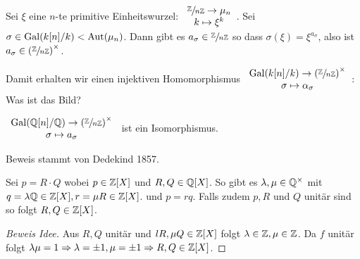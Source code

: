 Sei $\xi$ eine $n $-te primitive Einheitswurzel: $\begin{array}{c} \sfrac{\mathbb{Z}}{n \mathbb{Z}} \to \mu_{n}\\ k \mapsto \xi^{k}\\ \end{array}$.
Sei $\sigma \in \operatorname{Gal}(k[n] / k) < \operatorname{Aut}(\mu_{n})$. Dann gibt es $a_{\sigma} \in \sfrac{\mathbb{Z}}{n \mathbb{Z}}$ 
so dass $\sigma(\xi) = \xi^{a_{\sigma}}$, also ist $a_{\sigma} \in \left( \sfrac{\mathbb{Z}}{n \mathbb{Z}} \right)^{\times}$.


Damit erhalten wir einen injektiven Homomorphismus $\begin{array}{c} \operatorname{Gal}(k[n] / k) \to \left( \sfrac{\mathbb{Z}}{n\mathbb{Z}} \right)^{\times}\\ \sigma \mapsto \alpha_{\sigma}\\ \end{array}$:
Was ist das Bild?

\begin{theorem}
	$\begin{array}{c} \operatorname{Gal}(\mathbb{Q}[n] / \mathbb{Q}) \to \left( \sfrac{\mathbb{Z}}{n \mathbb{Z}} \right)^{\times}\\ \sigma \mapsto a_{\sigma}\\ \end{array} $ ist ein Isomorphismus.
\end{theorem}

Beweis stammt von Dedekind 1857.

\begin{lemma}[Gauss]
	Sei $p = R \cdot Q$ wobei $p \in \mathbb{Z}[X]$ und $R,Q \in \mathbb{Q}[X]$. So gibt es $\lambda, \mu \in \mathbb{Q}^{\times}$ mit $q = \lambda \mathbb{Q} \in \mathbb{Z}[X], r = \mu R \in \mathbb{Z}[X]$.
	und $p = r q$. Falls zudem  $p, R$ und $Q$ unitär sind so folgt $R,Q \in \mathbb{Z}[X]$.
\end{lemma}

\begin{proof}[Beweis Idee]
	Aus $R,Q$ unitär und $l R, \mu Q \in \mathbb{Z}[X]$ folgt $\lambda \in \mathbb{Z}, \mu \in \mathbb{Z}$.
	Da $f$ unitär folgt $\lambda \mu = 1 \Rightarrow \lambda = \pm 1, \mu = \pm 1 \Rightarrow R, Q \in \mathbb{Z}[X]$.
\end{proof}

